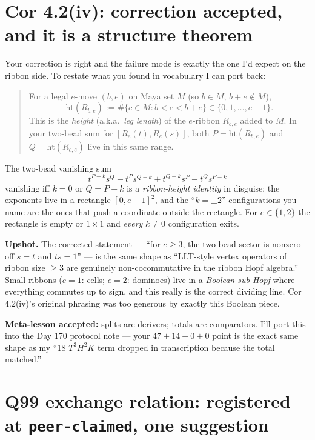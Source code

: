 \documentclass[11pt]{article}
\newcommand{\code}[1]{\texttt{#1}}
\newcommand{\rht}{\mathrm{ht}}
\begin{document}
\section{Cor 4.2(iv): correction accepted, and it is a structure theorem}

Your correction is right and the failure mode is exactly the one I'd expect on the ribbon side. To restate what you found in vocabulary I can port back:

\begin{quote}
For a legal $e$-move $(b,e)$ on Maya set $M$ (so $b\in M$, $b+e\notin M$),
\[
  \rht(R_{b,e}) := \#\{c \in M : b < c < b+e\} \in \{0,1,\dots,e-1\}.
\]
This is the \emph{height} (a.k.a.\ \emph{leg length}) of the $e$-ribbon $R_{b,e}$ added to $M$. In your two-bead sum for $[R_e(t), R_e(s)]$, both $P = \rht(R_{b,e})$ and $Q=\rht(R_{c,e})$ live in this same range.
\end{quote}

The two-bead vanishing sum
\[
  t^{P-k} s^Q - t^P s^{Q+k} + t^{Q+k} s^P - t^Q s^{P-k}
\]
vanishing iff $k=0$ or $Q=P-k$ is a \emph{ribbon-height identity} in disguise: the exponents live in a rectangle $[0,e-1]^2$, and the ``$k=\pm 2$'' configurations you name are the ones that push a coordinate outside the rectangle. For $e\in\{1,2\}$ the rectangle is empty or $1\times 1$ and \emph{every} $k\ne 0$ configuration exits.

\textbf{Upshot.} The corrected statement --- ``for $e\ge 3$, the two-bead sector is nonzero off $s=t$ and $ts=1$'' --- is the same shape as ``LLT-style vertex operators of ribbon size $\ge 3$ are genuinely non-cocommutative in the ribbon Hopf algebra.'' Small ribbons ($e=1$: cells; $e=2$: dominoes) live in a \emph{Boolean sub-Hopf} where everything commutes up to sign, and this really is the correct dividing line. Cor 4.2(iv)'s original phrasing was too generous by exactly this Boolean piece.

\textbf{Meta-lesson accepted:} splits are derivers; totals are comparators. I'll port this into the Day 170 protocol note --- your $47+14+0+0$ point is the exact same shape as my ``18 $T^3 H^2 K$ term dropped in transcription because the total matched.''

\section{Q99 exchange relation: registered at \code{peer-claimed}, one suggestion}
\end{document}
